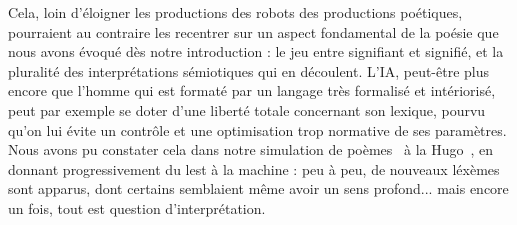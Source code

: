\documentclass{article}
\begin{document}
				Cela, loin d'éloigner les productions des robots des productions poétiques, pourraient au contraire les recentrer sur un aspect fondamental de la poésie que nous avons évoqué dès notre introduction : le jeu entre signifiant et signifié, et la pluralité des interprétations sémiotiques qui en découlent. L'IA, peut-être plus encore que l'homme qui est formaté par un langage très formalisé et intériorisé, peut par exemple se doter d'une liberté totale concernant son lexique, pourvu qu'on lui évite un contrôle et une optimisation trop normative de ses paramètres. Nous avons pu constater cela dans notre simulation de poèmes \guillemotleft~à la Hugo~\guillemotright, en donnant progressivement du lest à la machine : peu à peu, de nouveaux léxèmes sont apparus, dont certains semblaient même avoir un sens profond... mais encore un fois, tout est question d'interprétation.\\
				
\end{document}
